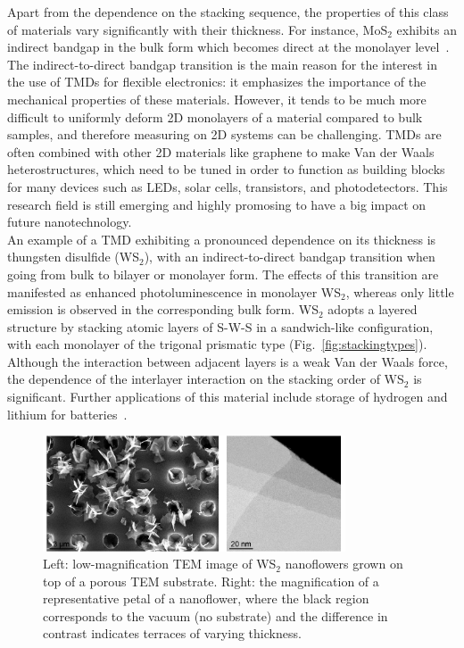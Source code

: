 Apart from the dependence on the stacking sequence, 
the properties of this class of materials vary significantly
with their thickness. For instance, MoS$_2$ exhibits an indirect bandgap
in the bulk form which becomes direct at the monolayer level~\cite{Splendiani:2010}.
%
The indirect-to-direct bandgap transition is the main reason for the interest in 
the use of TMDs for flexible electronics: it emphasizes the importance of the
mechanical properties of these materials. 
%
However, it tends to be much more difficult to uniformly deform 2D monolayers
of a material compared to bulk samples, and therefore measuring on 2D systems
can be challenging.
%
TMDs are often combined with other 2D materials like graphene
to make Van der Waals heterostructures, which need to be tuned in order
to function as building blocks for many devices such as LEDs, solar cells, 
transistors, and photodetectors.
%
This research field is still emerging and highly promosing to have a big
impact on future nanotechnology. \\
 
An example of a TMD exhibiting a pronounced dependence on its thickness is 
thungsten disulfide (WS$_2$), with an indirect-to-direct bandgap transition when going
from bulk to bilayer or monolayer form.
%
The effects of this transition are manifested as enhanced
photoluminescence in monolayer WS$_2$, whereas only little emission is observed in
the corresponding bulk form.
%
WS$_2$ adopts a layered structure by stacking atomic layers of S-W-S 
in a sandwich-like configuration, with each monolayer of the trigonal prismatic type (Fig.~\ref{fig:stackingtypes}). 
%
Although the interaction between adjacent layers is a weak Van der Waals 
force, the dependence of the interlayer interaction on the stacking 
order of WS$_2$ is significant.
%
Further applications of this material include storage of hydrogen 
and lithium for batteries~\cite{Bhandavat:2012}.

\begin{figure}[h]
    \centering
    \includegraphics[width=0.8\textwidth]{plots/spectrumimage.pdf}
    \caption{Left: low-magnification TEM image of WS$_2$ nanoflowers
      grown on top of a porous TEM substrate. Right: the magnification of a representative 
      petal of a nanoflower, where the black region corresponds to 
      the vacuum (no substrate) and the difference in contrast indicates terraces of varying thickness.}
    \label{fig:nanoflowers}
\end{figure}

